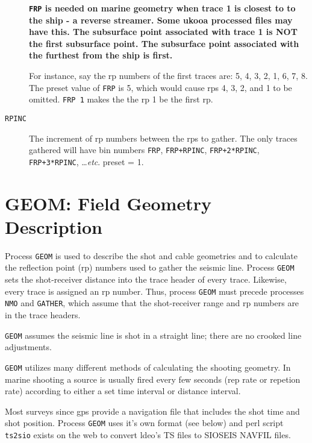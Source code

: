 \begin{description}
\textbf{\texttt{FRP} is needed on marine geometry when trace 1 is closest to
to the ship - a reverse streamer.  Some \gls{ukooa} processed files
may have this.  The subsurface point associated with trace 1
is NOT the first subsurface point.  The subsurface point
associated with the furthest from the ship is first.}

         For instance, say the \gls{rp} numbers of the first traces are:
         5, 4, 3, 2, 1, 6, 7, 8.  The preset value of \texttt{FRP} is 5, which
         would cause \glspl{rp} 4, 3, 2, and 1 to be omitted.  \texttt{FRP 1} makes the
         the \gls{rp} 1 be the first \gls{rp}.

\item[\texttt{RPINC}] The increment of \gls{rp} numbers between the \glspl{rp} to gather.  The
         only traces gathered will have bin numbers \texttt{FRP}, \texttt{FRP+RPINC},
         \texttt{FRP+2*RPINC}, \texttt{FRP+3*RPINC}, \ldots \textit{etc}.
         \Gls{preset} = 1.
\end{description}

\section{GEOM: Field Geometry Description}
\label{cmd_geom}

Process \texttt{GEOM} is used to describe the \gls{shot} and cable geometries and to
calculate the reflection point (\gls{rp}) numbers used to gather the seismic
line.  Process \texttt{GEOM} sets the shot-receiver distance into the trace
header of every trace.  Likewise, every trace is assigned an \gls{rp} number.
Thus, process \texttt{GEOM} must precede processes \texttt{NMO} and \texttt{GATHER}, which assume
that the shot-receiver range and \gls{rp} numbers are in the trace headers.

\texttt{GEOM} assumes the seismic line is \gls{shot} in a straight line; there are
no crooked line adjustments.

\texttt{GEOM} utilizes many different methods of calculating the shooting
geometry.  In marine shooting a source is usually fired every few
seconds (rep rate or repetion rate) according to either a set time
interval or distance interval.

Most surveys since \gls{gps} provide a navigation file that includes the
shot time and \gls{shot} position.  Process \texttt{GEOM} uses it's own format
(see below) and perl script \texttt{ts2sio} exists on the
web to convert \gls{ldeo}'s TS files to SIOSEIS NAVFIL files.

